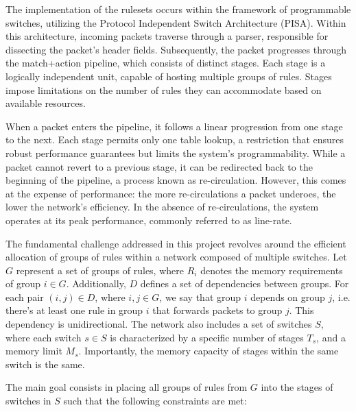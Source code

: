 The implementation of the rulesets occurs within the framework of programmable switches, utilizing the Protocol Independent Switch Architecture (PISA). Within this architecture, incoming packets traverse through a parser, responsible for dissecting the packet's header fields. Subsequently, the packet progresses through the match+action pipeline, which consists of distinct stages. Each stage is a logically independent unit, capable of hosting multiple groups of rules. Stages impose limitations on the number of rules they can accommodate based on available resources.

When a packet enters the pipeline, it follows a linear progression from one stage to the next. Each stage permits only one table lookup, a restriction that ensures robust performance guarantees but limits the system's programmability. While a packet cannot revert to a previous stage, it can be redirected back to the beginning of the pipeline, a process known as re-circulation. However, this comes at the expense of performance: the more re-circulations a packet underoes, the lower the network's efficiency. In the absence of re-circulations, the system operates at its peak performance, commonly referred to as line-rate.

The fundamental challenge addressed in this project revolves around the efficient allocation of groups of rules within a network composed of multiple switches. Let \(G\) represent a set of groups of rules, where \(R_i\) denotes the memory requirements of group \(i \in G\). Additionally, \(D\) defines a set of dependencies between groups. For each pair \((i, j) \in D\), where \(i, j \in G\), we say that group \(i\) depends on group \(j\), i.e. there's at least one rule in group \(i\) that forwards packets to group \(j\). This dependency is unidirectional. The network also includes a set of switches \(S\), where each switch \(s \in S\) is characterized by a specific number of stages \(T_s\), and a memory limit \(M_s\). Importantly, the memory capacity of stages within the same switch is the same.

The main goal consists in placing all groups of rules from \(G\) into the stages of switches in \(S\) such that the following constraints are met:

